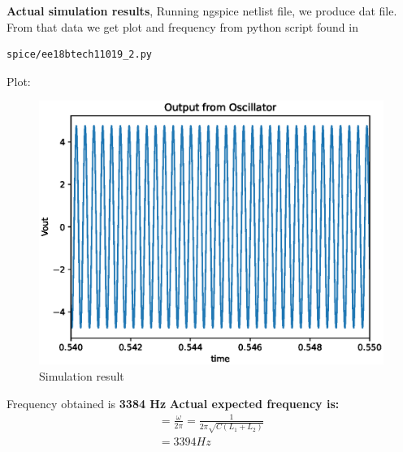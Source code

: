 \begin{enumerate}[label=\arabic*.,ref=\theenumi]
\textbf{Actual simulation results}, \newline
Running ngspice netlist file, we produce dat file. From that data we get plot and frequency from  python script found in\newline
\begin{lstlisting}
spice/ee18btech11019_2.py
\end{lstlisting}
Plot:\newline
\begin{figure}[!ht]
\centering
\includegraphics[width=\columnwidth]{./figs/ee18btech11019_6.eps}
\caption{Simulation result}
\label{fig:ee18btech11019_plot_2}
\end{figure}

Frequency obtained is \textbf{3384 Hz}\newline
\textbf{Actual expected frequency is:}
\begin{align}
    =\frac{\omega}{2\pi}
    = \frac{1}{2\pi \sqrt{C(L_1 +L_2)}}\\
    = 3394 Hz
\end{align}
\end{enumerate}